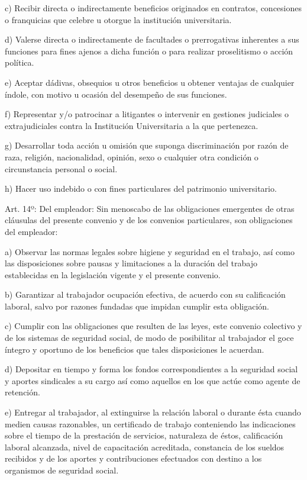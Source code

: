 \documentclass[]{article}
\begin{document}
c) Recibir directa o indirectamente beneficios originados en contratos,
concesiones o franquicias que celebre u otorgue la institución
universitaria.

d) Valerse directa o indirectamente de facultades o prerrogativas
inherentes a sus funciones para fines ajenos a dicha función o para
realizar proselitismo o acción política.

e) Aceptar dádivas, obsequios u otros beneficios u obtener ventajas de
cualquier índole, con motivo u ocasión del desempeño de sus funciones.

f) Representar y/o patrocinar a litigantes o intervenir en gestiones
judiciales o extrajudiciales contra la Institución Universitaria a la
que pertenezca.

g) Desarrollar toda acción u omisión que suponga discriminación por
razón de raza, religión, nacionalidad, opinión, sexo o cualquier otra
condición o circunstancia personal o social.

h) Hacer uso indebido o con fines particulares del patrimonio
universitario.

Art. 14º: Del empleador: Sin menoscabo de las obligaciones emergentes de
otras cláusulas del presente convenio y de los convenios particulares,
son obligaciones del empleador:

a) Observar las normas legales sobre higiene y seguridad en el trabajo,
así como las disposiciones sobre pausas y limitaciones a la duración del
trabajo establecidas en la legislación vigente y el presente convenio.

b) Garantizar al trabajador ocupación efectiva, de acuerdo con su
calificación laboral, salvo por razones fundadas que impidan cumplir
esta obligación.

c) Cumplir con las obligaciones que resulten de las leyes, este convenio
colectivo y de los sistemas de seguridad social, de modo de posibilitar
al trabajador el goce íntegro y oportuno de los beneficios que tales
disposiciones le acuerdan.

d) Depositar en tiempo y forma los fondos correspondientes a la
seguridad social y aportes sindicales a su cargo así como aquellos en
los que actúe como agente de retención.

e) Entregar al trabajador, al extinguirse la relación laboral o durante
ésta cuando medien causas razonables, un certificado de trabajo
conteniendo las indicaciones sobre el tiempo de la prestación de
servicios, naturaleza de éstos, calificación laboral alcanzada, nivel de
capacitación acreditada, constancia de los sueldos recibidos y de los
aportes y contribuciones efectuados con destino a los organismos de
seguridad social.
\end{document}
